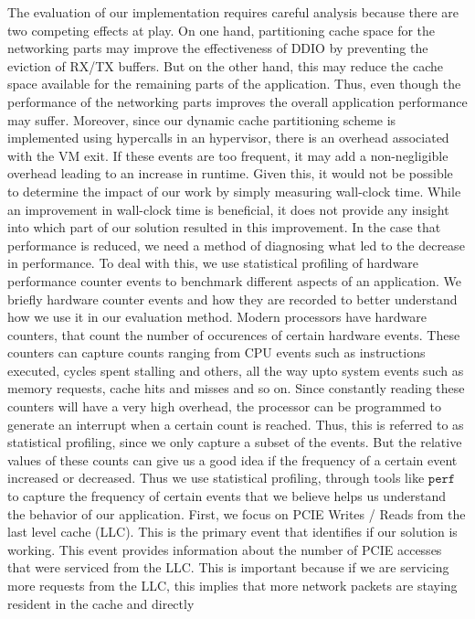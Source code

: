 \documentclass[sigconf,authorversion,noacm]{acmart}
\begin{document}
The evaluation of our implementation requires careful analysis because there are
two competing effects at play. On one hand, partitioning cache space for the
networking parts may improve the effectiveness of DDIO by preventing the
eviction of RX/TX buffers. But on the other hand, this may reduce the cache
space available for the remaining parts of the application. Thus, even though
the performance of the networking parts improves the overall application
performance may suffer. Moreover, since our dynamic cache partitioning scheme is
implemented using hypercalls in an hypervisor, there is an overhead associated
with the VM exit. If these events are too frequent, it may add a non-negligible
overhead leading to an increase in runtime. Given this, it would not be possible
to determine the impact of our work by simply measuring wall-clock time. While
an improvement in wall-clock time is beneficial, it does not provide any insight
into which part of our solution resulted in this improvement. In the case that
performance is reduced, we need a method of diagnosing what led to the decrease
in performance. To deal with this, we use statistical profiling of hardware
performance counter events to benchmark different aspects of an application. We
briefly hardware counter events and how they are recorded to better understand
how we use it in our evaluation method. Modern processors have hardware
counters, that count the number of occurences of certain hardware events. These
counters can capture counts ranging from CPU events such as instructions
executed, cycles spent stalling and others, all the way upto system events such
as memory requests, cache hits and misses and so on. Since constantly reading
these counters will have a very high overhead, the processor can be programmed
to generate an interrupt when a certain count is reached. Thus, this is referred
to as statistical profiling, since we only capture a subset of the events. But
the relative values of these counts can give us a good idea if the frequency of
a certain event increased or decreased. Thus we use statistical profiling,
through tools like $\texttt{perf}$ to capture the frequency of certain events
that we believe helps us understand the behavior of our application. First, we
focus on PCIE Writes / Reads from the last level cache (LLC). This is the
primary event that identifies if our solution is working. This event provides
information about the number of PCIE accesses that were serviced from the LLC.
This is important because if we are servicing more requests from the LLC, this
implies that more network packets are staying resident in the cache and directly
\end{document}
